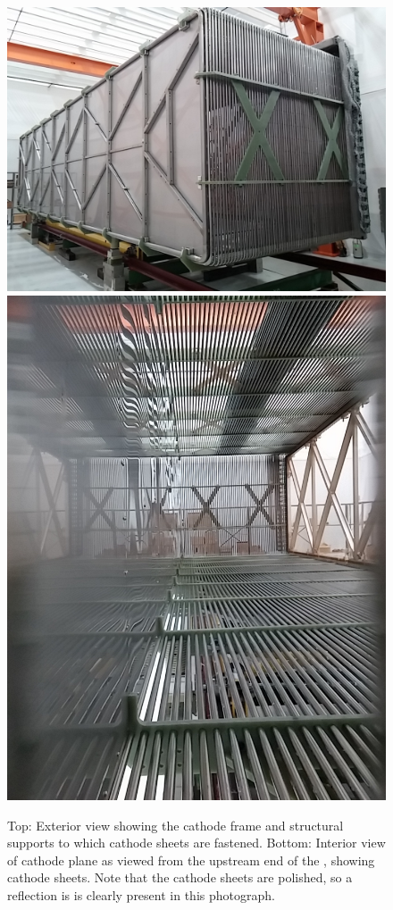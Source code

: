 \begin{figure}
\centering	
\includegraphics[width=0.62\linewidth]{figures/tpc-completed-upstream-left.jpg}
\includegraphics[width=0.62\linewidth]{figures/tpc-upstream-interior.jpg}
\caption{Top: Exterior view showing the cathode frame and structural supports to which cathode sheets are fastened.  Bottom: Interior view of cathode plane as viewed from the upstream end of the \lartpc, showing cathode sheets.  Note that the cathode sheets are polished, so a reflection is is clearly present in this photograph.}
\label{fig:tpc-cathode}
\end{figure}


